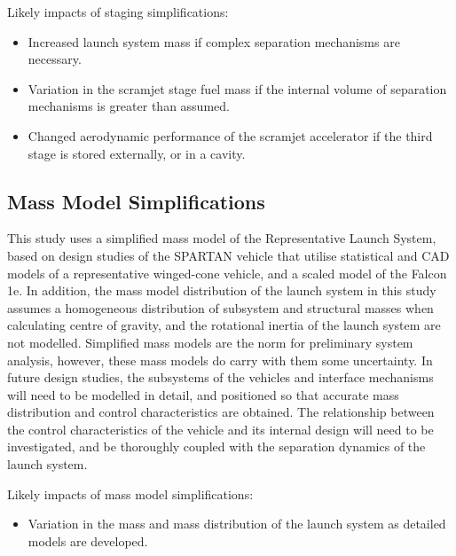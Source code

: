 Likely impacts of staging simplifications:
\begin{itemize}[noitemsep,topsep=0pt]
	\item Increased launch system mass if complex separation mechanisms are necessary.
	\item Variation in the scramjet stage fuel mass if the internal volume of separation mechanisms is greater than assumed. 
	\item Changed aerodynamic performance of the scramjet accelerator if the third stage is stored externally, or in a cavity. 
\end{itemize}


\subsection{Mass Model Simplifications}

This study uses a simplified mass model of the Representative Launch System, based on design studies of the SPARTAN vehicle\cite{Preller2017b} that utilise statistical and CAD models of a representative winged-cone vehicle\cite{Preller2018}, and a scaled model of the Falcon 1e\cite{Vehicle2008}. In addition, the mass model distribution of the launch system in this study assumes a homogeneous distribution of subsystem and structural masses when calculating centre of gravity, and the rotational inertia of the launch system are not modelled.
Simplified mass models are the norm for preliminary system analysis\cite{Argus,Powell1991,Trefny1999,Roche2000,Pescetelli2012,Young2006,Bradford2000,Hyperion,Wilhite1991,Fujikawa2017,Mehta2001,Takahashi1997,Germain2001,Eklund2012,Bradford2002,Kimura1999,Preller2018a}, however, these mass models do carry with them some uncertainty. In future design studies, the subsystems of the vehicles and interface mechanisms will need to be modelled in detail, and positioned so that accurate mass distribution and control characteristics are obtained. The relationship between the control characteristics of the vehicle and its internal design will need to be investigated, and be thoroughly coupled with the separation dynamics of the launch system. 

Likely impacts of mass model simplifications:
\begin{itemize}[noitemsep,topsep=0pt]
	\item Variation in the mass and mass distribution of the launch system as detailed models are developed. 
\end{itemize}


